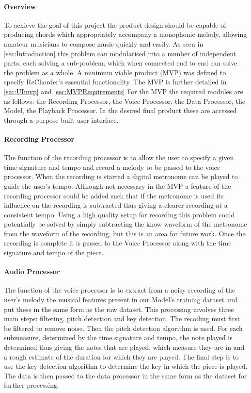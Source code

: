 \paragraph{Overview}
To achieve the goal of this project the product design should be capable of producing chords which appropriately accompany a monophonic melody, allowing amateur musicians to compose music quickly and easily.
As seen in \cref{sec:Introduction} this problem can modularised into a number of independent parts, each solving a sub-problem, which when connected end to end can solve the problem as a whole.
A minimum viable product (MVP) was defined to specify ReChorder's essential functionality.
The MVP is further detailed in \cref{sec:UImvp} and \cref{sec:MVPRequirements}
For the MVP the required modules are as follows: the Recording Processor, the Voice Processor, the Data Processor, the Model, the Playback Processor.
In the desired final product these are accessed through a purpose built user interface.

\paragraph{Recording Processor}

The function of the recording processor is to allow the user to specify a given time signature and tempo and record a melody to be passed to the voice processor.
When the recording is started a digital metronome can be played to guide the user's tempo. 
Although not necessary in the MVP a feature of the recording processor could be added such that if the metronome is used its influence on the recording is subtracted thus giving a clearer recording at a consistent tempo.
Using a high quality setup for recording this problem could potentially be solved by simply subtracting the know waveform of the metronome from the waveform of the recording, but this is an area for future work.
Once the recording is complete it is passed to the Voice Processor along with the time signature and tempo of the piece.

\paragraph{Audio Processor}

The function of the voice processor is to extract from a noisy recording of the user's melody the musical features present in our Model's training dataset and put these in the same form as the raw dataset.
This processing involves three main steps: filtering, pitch detection and key detection.
The recoding must first be filtered to remove noise.
Then the pitch detection algorithm is used.
For each submeasure, determined by the time signature and tempo, the note played is determined thus giving the notes that are played, which measure they are in and a rough estimate of the duration for which they are played.
The final step is to use the key detection algorithm to determine the key in which the piece is played.
The data is then passed to the data processor in the same form as the dataset for further processing.

